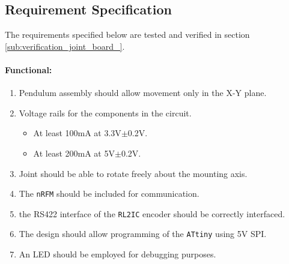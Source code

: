 \subsection{Requirement Specification}
\label{subs:joint_requirements}
The requirements specified below are tested and verified in section \ref{sub:verification_joint_board_}.
\paragraph{Functional:}
\begin{enumerate}[resume]
	\item Pendulum assembly should allow movement only in the X-Y plane. 
	\label{enum:pendulum_should_only_x_y}
	\item Voltage rails for the components in the circuit.
	\label{enum:joint_voltage_rails}
	\begin{itemize}
		\item At least 100mA at 3.3V$\pm$0.2V.
		\item At least 200mA at 5V$\pm$0.2V.
	\end{itemize}
	\item Joint should be able to rotate freely about the mounting axis.
	\label{enum:rotate_freely_joint}
	\item The \texttt{nRFM} should be included for communication.
	\label{enum:joint_include_nrf}
	\item the RS422 interface of the \texttt{RL2IC} encoder should be correctly interfaced.
	\label{enum:interface_rs422_enc}
	\item The design should allow programming of the \texttt{ATtiny} using 5V SPI.
	\label{enum:program_5v_spi}
	\item An LED should be employed for debugging purposes.
	\label{enum:led_debugging_joint}
\end{enumerate}

